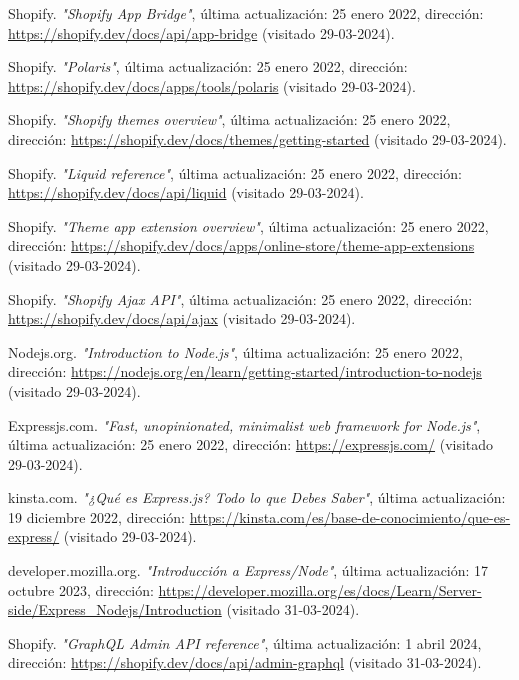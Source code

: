 \documentclass[12pt]{article}
\begin{document}
\begin{thebibliography}{100}
    Shopify.
    \textit{"Shopify App Bridge"}, última actualización: 25 enero 2022, dirección: \url{https://shopify.dev/docs/api/app-bridge} (visitado 29-03-2024).

    Shopify.
    \textit{"Polaris"}, última actualización: 25 enero 2022, dirección: \url{https://shopify.dev/docs/apps/tools/polaris} (visitado 29-03-2024).

    Shopify.
    \textit{"Shopify themes overview"}, última actualización: 25 enero 2022, dirección: \url{https://shopify.dev/docs/themes/getting-started} (visitado 29-03-2024).

    Shopify.
    \textit{"Liquid reference"}, última actualización: 25 enero 2022, dirección: \url{https://shopify.dev/docs/api/liquid} (visitado 29-03-2024).

    Shopify.
    \textit{"Theme app extension overview"}, última actualización: 25 enero 2022, dirección: \url{https://shopify.dev/docs/apps/online-store/theme-app-extensions} (visitado 29-03-2024).

    Shopify.
    \textit{"Shopify Ajax API"}, última actualización: 25 enero 2022, dirección: \url{https://shopify.dev/docs/api/ajax} (visitado 29-03-2024).

    Nodejs.org.
    \textit{"Introduction to Node.js"}, última actualización: 25 enero 2022, dirección: \url{https://nodejs.org/en/learn/getting-started/introduction-to-nodejs} (visitado 29-03-2024).

    Expressjs.com.
    \textit{"Fast, unopinionated, minimalist web framework for Node.js"}, última actualización: 25 enero 2022, dirección: \url{https://expressjs.com/} (visitado 29-03-2024).

    kinsta.com.
    \textit{"¿Qué es Express.js? Todo lo que Debes Saber"}, última actualización: 19 diciembre 2022, dirección: \url{https://kinsta.com/es/base-de-conocimiento/que-es-express/} (visitado 29-03-2024).
    
    developer.mozilla.org.
    \textit{"Introducción a Express/Node"}, última actualización: 17 octubre 2023, dirección: \url{https://developer.mozilla.org/es/docs/Learn/Server-side/Express_Nodejs/Introduction} (visitado 31-03-2024).

    Shopify.
    \textit{"GraphQL Admin API reference"}, última actualización: 1 abril 2024, dirección: \url{https://shopify.dev/docs/api/admin-graphql} (visitado 31-03-2024).


\end{thebibliography}
\end{document}
